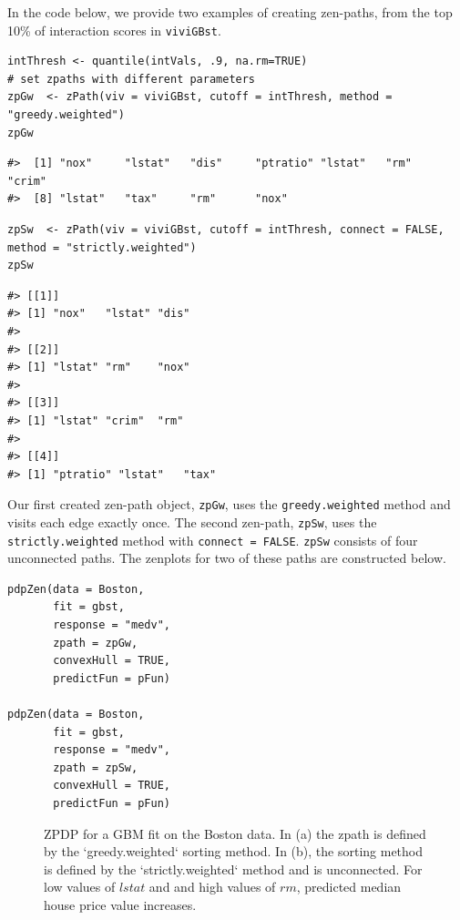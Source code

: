 In the code below, we provide two examples of creating zen-paths, from the top 10\% of interaction scores in \texttt{viviGBst}.

\begin{verbatim}
intThresh <- quantile(intVals, .9, na.rm=TRUE)
# set zpaths with different parameters
zpGw  <- zPath(viv = viviGBst, cutoff = intThresh, method = "greedy.weighted")
zpGw
\end{verbatim}

\begin{verbatim}
#>  [1] "nox"     "lstat"   "dis"     "ptratio" "lstat"   "rm"      "crim"   
#>  [8] "lstat"   "tax"     "rm"      "nox"
\end{verbatim}

\begin{verbatim}
zpSw  <- zPath(viv = viviGBst, cutoff = intThresh, connect = FALSE, method = "strictly.weighted")
zpSw
\end{verbatim}

\begin{verbatim}
#> [[1]]
#> [1] "nox"   "lstat" "dis"  
#> 
#> [[2]]
#> [1] "lstat" "rm"    "nox"  
#> 
#> [[3]]
#> [1] "lstat" "crim"  "rm"   
#> 
#> [[4]]
#> [1] "ptratio" "lstat"   "tax"
\end{verbatim}

Our first created zen-path object, \texttt{zpGw}, uses the \texttt{greedy.weighted} method and visits each edge exactly once. The second zen-path, \texttt{zpSw}, uses the \texttt{strictly.weighted} method with \texttt{connect\ =\ FALSE}.
\texttt{zpSw} consists of four unconnected paths.
The zenplots for two of these paths are constructed below.

\begin{verbatim}
pdpZen(data = Boston,
       fit = gbst,
       response = "medv",
       zpath = zpGw,
       convexHull = TRUE,
       predictFun = pFun) 

pdpZen(data = Boston,
       fit = gbst,
       response = "medv",
       zpath = zpSw,
       convexHull = TRUE,
       predictFun = pFun)
\end{verbatim}

\begin{figure}

{\centering {}

}

\caption{ZPDP for a GBM fit on the Boston data. In (a) the zpath is defined by the `greedy.weighted` sorting method. In (b), the sorting method is defined by the `strictly.weighted` method and is unconnected. For low values of $lstat$ and and high values of $rm$, predicted median house price value increases.}\label{fig:zpdpGBM}
\end{figure}

